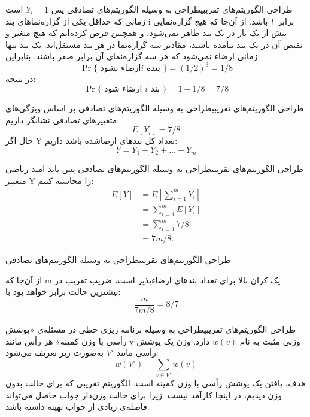 \begin{itemframe-s}{طراحی الگوریتم‌های تقریبی}{طراحی به وسیله الگوریتم‌های تصادفی}
\itm
پس
$Y_i = 1$
است زمانی که حداقل یکی از گزاره‌نماهای
بند i برابر ۱ باشد.
از آن‌جا که هیچ گزاره‌نمایی بیش از یک بار در یک بند ظاهر نمی‌شود، و همچنین فرض کرده‌ایم که هیچ متغیر و نقیض آن در یک بند نیامده باشند، مقادیر سه گزاره‌نما در هر بند مستقل‌اند.
\itm
یک بند تنها زمانی ارضاء نمی‌شود که هر سه گزاره‌نمای آن برابر صفر باشند. بنابراین:
$$
\Pr\{\text{ ارضاء نشود} i \text{ بنده }\} = (1/2)^3 = 1/8
$$
در نتیجه:
$$
\Pr \{\text{ ارضاء شود } i \text{ بند }\} = 1 - 1/8 = 7/8
$$
\end{itemframe-s}


\begin{itemframe-s}{طراحی الگوریتم‌های تقریبی}{طراحی به وسیله الگوریتم‌های تصادفی}
\itm
بر اساس ویژگی‌های متغییرهای تصادفی نشانگر داریم:
$$
E[Y_i] = 7/8
$$
حال اگر Y تعداد کل بندهای ارضاشده باشد داریم:
$$
Y = Y_1 + Y_2 + \dots + Y_m
$$

\end{itemframe-s}


\begin{itemframe-s}{طراحی الگوریتم‌های تقریبی}{طراحی به وسیله الگوریتم‌های تصادفی}
\itm
پس باید امید ریاضی متغییر  Y را محاسبه کنیم:
\begin{align*}
E[Y] &= E\left[\sum_{i=1}^m Y_i\right] \\[2pt]
     &= \sum_{i=1}^m E[Y_i]  \\[2pt]
     &= \sum_{i=1}^m 7/8 \\[2pt]
     &= 7m/8.
\end{align*}

\end{itemframe-s}


\begin{itemframe-s}{طراحی الگوریتم‌های تقریبی}{طراحی به وسیله الگوریتم‌های تصادفی}

\itm
از آن‌جا که m یک کران بالا برای تعداد بندهای ارضاء‌پذیر است، ضریب تقریب در بیشترین حالت برابر خواهد بود با:
$$
\frac{m}{7m/8} = 8/7
$$


\end{itemframe-s}


\begin{itemframe-s}{طراحی الگوریتم‌های تقریبی}{طراحی به وسیله برنامه ریزی خطی}
\itm
در مسئله‌ی «پوشش رأسی با وزن کمینه‌»
هر رأس مانند v وزنی مثبت به نام $w(v)$ دارد.
وزن یک پوشش رأسی مانند
$V'$
به‌صورت زیر تعریف می‌شود:
$$
w(V') = \sum_{v \in V'} w(v)
$$
هدف، یافتن یک پوشش رأسی با وزن کمینه است.
\itm
الگوریتم تقریبی که برای حالت بدون وزن دیدیم، در اینجا کارآمد نیست.
زیرا برای حالت وزن‌دار جواب حاصل می‌تواند فاصله‌ی زیادی از جواب بهینه داشته باشد.
\end{itemframe-s}


